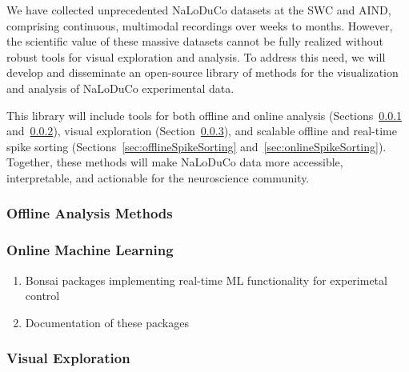 We have collected unprecedented NaLoDuCo datasets at the SWC and AIND,
comprising continuous, multimodal recordings over weeks to months. However, the
scientific value of these massive datasets cannot be fully realized without
robust tools for visual exploration and analysis. To address this need, we will
develop and disseminate an open-source library of methods for the visualization
and analysis of NaLoDuCo experimental data.

This library will include tools for both offline and online analysis
(Sections~\ref{sec:offlineAnalysisMethods}
and~\ref{sec:onlineAnalysisMethods}), visual exploration
(Section~\ref{sec:visualExploration}), and scalable offline and real-time spike
sorting (Sections~\ref{sec:offlineSpikeSorting}
and~\ref{sec:onlineSpikeSorting}). Together, these methods will make NaLoDuCo
data more accessible, interpretable, and actionable for the neuroscience
community.

\subsubsection{Offline Analysis Methods}
\label{sec:offlineAnalysisMethods}



\subsubsection{Online Machine Learning}
\label{sec:onlineAnalysisMethods}


\begin{enumerate}

    \item Bonsai packages implementing real-time ML functionality for experimetal control

    \item Documentation of these packages

\end{enumerate}

\subsubsection{Visual Exploration}
\label{sec:visualExploration}


